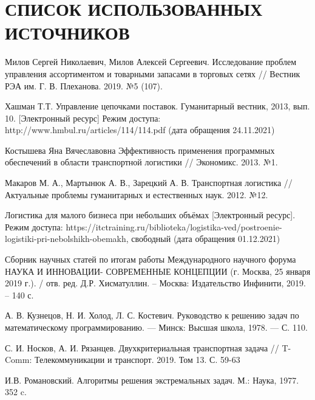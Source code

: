 \section*{СПИСОК ИСПОЛЬЗОВАННЫХ ИСТОЧНИКОВ}

\begingroup
\renewcommand{\section}[2]{}
\begin{thebibliography}{}
	 Милов Сергей Николаевич, Милов Алексей Сергеевич. Исследование проблем управления ассортиментом и товарными запасами в торговых сетях // Вестник РЭА им. Г. В. Плеханова. 2019. №5 (107).
	
	 Хашман Т.Т. Управление цепочками поставок. Гуманитарный вестник,
	2013, вып. 10. [Электронный ресурс] Режим доступа: http://www.hmbul.ru/articles/114/114.pdf (дата обращения 24.11.2021)
	
	 Костышева Яна Вячеславовна Эффективность применения программных обеспечений в области транспортной логистики // Экономикс. 2013. №1.
	
	 Макаров М. А., Мартынюк А. В., Зарецкий А. В. Транспортная логистика // Актуальные проблемы гуманитарных и естественных наук. 2012. №12.
	
	 Логистика для малого бизнеса при небольших объёмах [Электронный ресурс]. Режим доступа: https://itctraining.ru/biblioteka/logistika-ved/postroenie-logistiki-pri-nebolshikh-obemakh, свободный (дата обращения 01.12.2021)
	
	 Сборник научных статей по итогам работы Международного
	научного форума НАУКА И ИННОВАЦИИ- СОВРЕМЕННЫЕ
	КОНЦЕПЦИИ (г. Москва, 25 января 2019 г.). / отв. ред. Д.Р.
	Хисматуллин. – Москва: Издательство Инфинити, 2019. – 140 с.
	
	 А. В. Кузнецов, Н. И. Холод, Л. С. Костевич. Руководство к решению задач по математическому программированию. — Минск: Высшая школа, 1978. — С. 110.
	
	 С. И. Носков, А. И. Рязанцев. Двухкритериальная транспортная задача // T-Comm: Телекоммуникации и транспорт. 2019. Том 13. С. 59-63
	
	 И.В. Романовский. Алгоритмы решения экстремальных задач. М.: Наука, 1977. 352 c.
\end{thebibliography}
\endgroup

\pagebreak